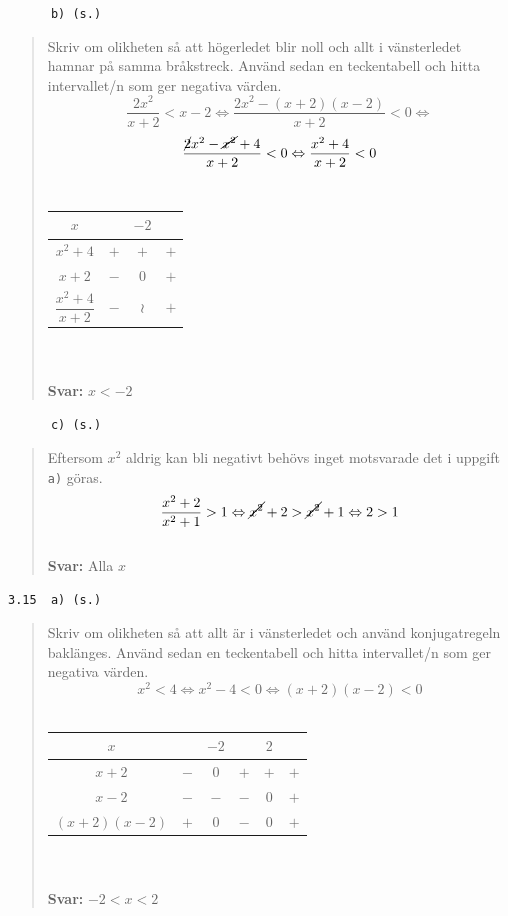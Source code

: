 \documentclass[a4paper]{article}
\newcommand{\tskcol}[1]{\textcolor{tskcol}{#1}}
\begin{document}
	\texttt{\tskcol{~~~~~~b) (s.)}}
	\begin{quotation}
		\noindent
		Skriv om olikheten så att högerledet blir noll och allt i vänsterledet hamnar på samma bråkstreck. Använd sedan en teckentabell och hitta intervallet/n som ger negativa värden.
		\[\dfrac{2x^2}{x+2}<x-2 \Leftrightarrow
		\dfrac{2x^2-(x+2)(x-2)}{x+2}<0 \Leftrightarrow\]
		\[\dfrac{\cancel{2}x^2-\cancel{x^2}+4}{x+2}<0 \Leftrightarrow
		\dfrac{x^2+4}{x+2}<0\] \\
		\begin{tabular}{c|c|c|c}
			$x$ & & $-2$ & \\ \hline
			$x^2+4$              & $+$ & $+$ & $+$ \\
			$x+2$                & $-$ & $0$ & $+$ \\ \hline
			$\dfrac{x^2+4}{x+2}$ & $-$ &$\wr$& $+$ 
		\end{tabular}
		\\ \\
		\textbf{Svar:} $x<-2$
	\end{quotation}
	
	\pagebreak
	\texttt{\tskcol{~~~~~~c) (s.)}}
	\begin{quotation}
		\noindent
		Eftersom $x^2$ aldrig kan bli negativt behövs inget motsvarade det i uppgift \texttt{\tskcol{a)}} göras.
		\[\dfrac{x^2+2}{x^2+1}>1 \Leftrightarrow
		\cancel{x^2}+2>\cancel{x^2}+1 \Leftrightarrow
		2>1\]
		\\
		\textbf{Svar:} Alla $x$
	\end{quotation}
	
	\texttt{\tskcol{3.15~~a) (s.)}}
	\begin{quotation}
		\noindent
		Skriv om olikheten så att allt är i vänsterledet och använd konjugatregeln baklänges. Använd sedan en teckentabell och hitta intervallet/n som ger negativa värden.
		\[x^2<4 \Leftrightarrow
		x^2-4<0 \Leftrightarrow
		(x+2)(x-2)<0\] \\
		\begin{tabular}{c|c|c|c|c|c}
			$x$ & & $-2$ & & $2$ & \\ \hline
			$x+2$        & $-$ & $0$ & $+$ & $+$ & $+$ \\
			$x-2$        & $-$ & $-$ & $-$ & $0$ & $+$ \\ \hline
			$(x+2)(x-2)$ & $+$ & $0$ & $-$ & $0$ & $+$ 
		\end{tabular}
		\\ \\
		\textbf{Svar:} $-2<x<2$
	\end{quotation}
	
\end{document}
